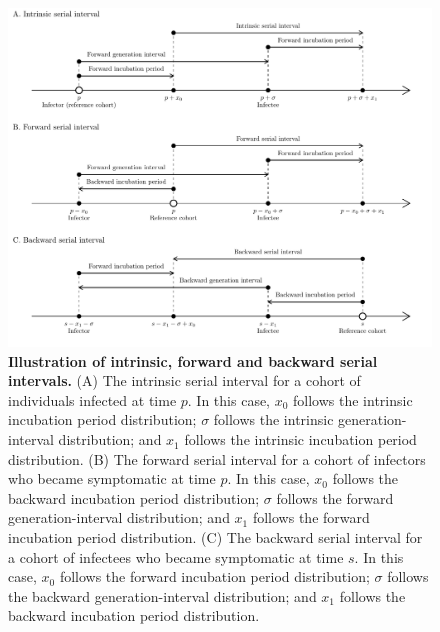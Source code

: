 \documentclass[12pt]{article}
\newcommand{\psymp}{\ensuremath{p}} %
\newcommand{\ssymp}{\ensuremath{s}} %
\newcommand{\gtime}{\sigma} %
\begin{document}
\begin{figure}[!th]
\includegraphics[width=\textwidth]{serial_guide.pdf}
\caption{
\textbf{Illustration of intrinsic, forward and backward serial intervals.}
(A) The intrinsic serial interval for a cohort of individuals infected at time $\psymp$.
In this case, $x_0$ follows the intrinsic incubation period distribution;
$\gtime$ follows the intrinsic generation-interval distribution;
and $x_1$ follows the intrinsic incubation period distribution.
(B) The forward serial interval for a cohort of infectors who became symptomatic at time $\psymp$.
In this case, $x_0$ follows the backward incubation period distribution;
$\gtime$ follows the forward generation-interval distribution;
and $x_1$ follows the forward incubation period distribution.
(C) The backward serial interval for a cohort of infectees who became symptomatic at time $\ssymp$.
In this case, $x_0$ follows the forward incubation period distribution;
$\gtime$ follows the backward generation-interval distribution;
and $x_1$ follows the backward incubation period distribution.
}
\label{fig:diagram}
\end{figure}
\end{document}
